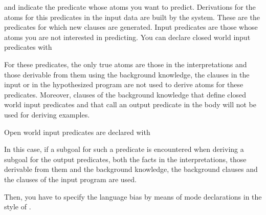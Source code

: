 \documentclass[letterpaper,10pt,english]{sphinxmanual}
\begin{document}
\begin{sphinxVerbatim}[commandchars=\\\{\}]
\end{sphinxVerbatim}

and indicate the predicate whose atoms you want to predict.
Derivations for the atoms for this predicates in the input data are built by the system.
These are the predicates for which new clauses are generated.
Input predicates are those whose atoms you are not interested in predicting.
You can declare closed world input predicates with

\begin{sphinxVerbatim}[commandchars=\\\{\}]
\end{sphinxVerbatim}

For these predicates, the only true atoms are those in the interpretations and those derivable from them using the background knowledge, the clauses in the input or in the hypothesized program are not used to derive atoms for these predicates. Moreover, clauses of the background knowledge that define closed world input predicates and that call an output predicate in the body will not be used for deriving examples.

Open world input predicates are declared with

\begin{sphinxVerbatim}[commandchars=\\\{\}]
\end{sphinxVerbatim}

In this case, if a subgoal for such a predicate is encountered when deriving a subgoal for the output predicates, both the facts in the interpretations, those derivable from them and the background knowledge, the background clauses and the clauses of the input program are used.

Then, you have to specify the language bias by means of mode declarations in the style of .
\end{document}
